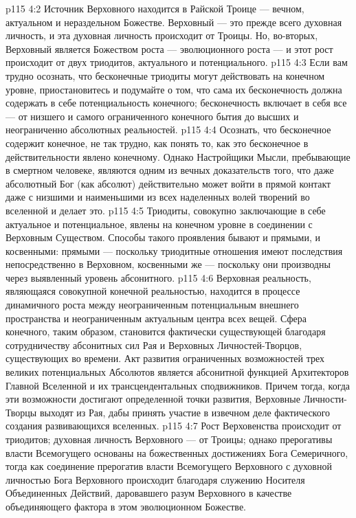 \vs p115 4:2 Источник Верховного находится в Райской Троице --- вечном, актуальном и нераздельном Божестве. Верховный --- это прежде всего духовная личность, и эта духовная личность происходит от Троицы. Но, во\hyp{}вторых, Верховный является Божеством роста --- эволюционного роста --- и этот рост происходит от двух триодитов, актуального и потенциального.
\vs p115 4:3 Если вам трудно осознать, что бесконечные триодиты могут действовать на конечном уровне, приостановитесь и подумайте о том, что сама их бесконечность должна содержать в себе потенциальность конечного; бесконечность включает в себя все --- от низшего и самого ограниченного конечного бытия до высших и неограниченно абсолютных реальностей.
\vs p115 4:4 Осознать, что бесконечное содержит конечное, не так трудно, как понять то, как это бесконечное в действительности явлено конечному. Однако Настройщики Мысли, пребывающие в смертном человеке, являются одним из вечных доказательств того, что даже абсолютный Бог (как абсолют) действительно может войти в прямой контакт даже с низшими и наименьшими из всех наделенных волей творений во вселенной и делает это.
\vs p115 4:5 Триодиты, совокупно заключающие в себе актуальное и потенциальное, явлены на конечном уровне в соединении с Верховным Существом. Способы такого проявления бывают и прямыми, и косвенными: прямыми --- поскольку триодитные отношения имеют последствия непосредственно в Верховном, косвенными же --- поскольку они производны через выявленный уровень абсонитного.
\vs p115 4:6 Верховная реальность, являющаяся совокупной конечной реальностью, находится в процессе динамичного роста между неограниченным потенциальным внешнего пространства и неограниченным актуальным центра всех вещей. Сфера конечного, таким образом, становится фактически существующей благодаря сотрудничеству абсонитных сил Рая и Верховных Личностей\hyp{}Творцов, существующих во времени. Акт развития ограниченных возможностей трех великих потенциальных Абсолютов является абсонитной функцией Архитекторов Главной Вселенной и их трансцендентальных сподвижников. Причем тогда, когда эти возможности достигают определенной точки развития, Верховные Личности\hyp{}Творцы выходят из Рая, дабы принять участие в извечном деле фактического создания развивающихся вселенных.
\vs p115 4:7 Рост Верховенства происходит от триодитов; духовная личность Верховного --- от Троицы; однако прерогативы власти Всемогущего основаны на божественных достижениях Бога Семеричного, тогда как соединение прерогатив власти Всемогущего Верховного с духовной личностью Бога Верховного происходит благодаря служению Носителя Объединенных Действий, даровавшего разум Верховного в качестве объединяющего фактора в этом эволюционном Божестве.
